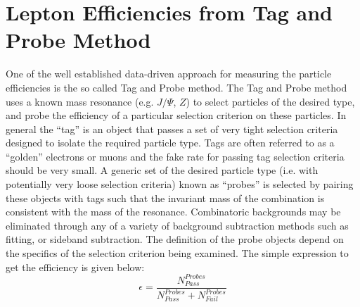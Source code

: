 \section{Lepton Efficiencies from Tag and Probe Method}
\label{TP}
One of the well established data-driven approach for measuring the particle efficiencies is the
so called Tag and Probe method. The Tag and Probe method uses a known mass resonance (e.g. $J/\Psi$, $Z$) to select particles of the desired type, and probe the efficiency of a particular
selection criterion on these particles. In general the “tag” is an object that passes a set of very
tight selection criteria designed to isolate the required particle type. Tags are often referred
to as a “golden” electrons or muons and the fake rate for passing tag selection criteria should
be very small. A generic set of the desired particle type (i.e. with potentially very loose selection 
criteria) known as “probes” is selected by pairing these objects with tags such that the
invariant mass of the combination is consistent with the mass of the resonance. Combinatoric
backgrounds may be eliminated through any of a variety of background subtraction methods
such as fitting, or sideband subtraction. The definition of the probe objects depend on the specifics of the selection criterion being examined. The simple expression to get the efficiency %
is given below:
\begin{equation}
\epsilon=\frac{N_{Pass}^{Probes}}{N_{Pass}^{Probes}+N_{Fail}^{Probes}}
\end{equation}

